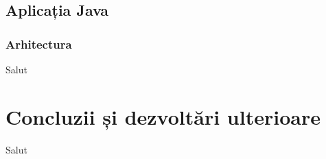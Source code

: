 \documentclass[12pt]{article}
\begin{document}

\subsection{Aplicația Java}

\subsubsection{Arhitectura}

Salut

\section{Concluzii și dezvoltări ulterioare}

Salut
\end{document}

